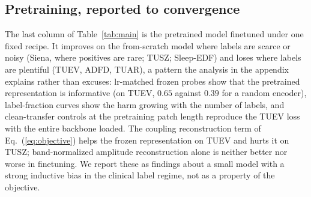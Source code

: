 \subsection{Pretraining, reported to convergence}
\label{sec:pretrain-results}

The last column of Table~\ref{tab:main} is the pretrained model finetuned
under one fixed recipe. It improves on the from-scratch model where labels
are scarce or noisy (Siena, where positives are rare; TUSZ; Sleep-EDF) and
loses where labels are plentiful (TUEV, ADFD, TUAR), a pattern the analysis
in the appendix explains rather than excuses: lr-matched frozen probes show
that the pretrained representation is informative (on TUEV, $0.65$ against
$0.39$ for a random encoder), label-fraction curves show the harm growing
with the number of labels, and clean-transfer controls at the pretraining
patch length reproduce the TUEV loss with the entire backbone loaded. The
coupling reconstruction term of Eq.~(\ref{eq:objective}) helps the frozen
representation on TUEV and hurts it on TUSZ; band-normalized amplitude
reconstruction alone \citep{yu2026understanding} is neither better nor
worse in finetuning. We report these as findings about a small model with a
strong inductive bias in the clinical label regime, not as a property of
the objective.
